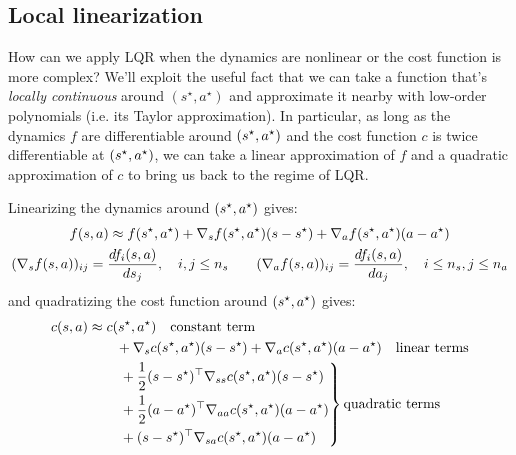 \documentclass[\main/main]{subfiles}
\begin{document}
\subsection{Local linearization}

How can we apply LQR when the dynamics are nonlinear or the cost function is more complex?
We'll exploit the useful fact that we can take a function that's \emph{locally continuous} around $(s^\star, a^\star)$ and approximate it nearby with low-order polynomials (i.e. its Taylor approximation).
In particular, as long as the dynamics $f$ are differentiable around $(s^\star, a^\star)$ and the cost function $c$ is twice differentiable at $(s^\star, a^\star)$, we can take a linear approximation of $f$ and a quadratic approximation of $c$ to bring us back to the regime of LQR.

Linearizing the dynamics around $(s^\star, a^\star)$ gives:
\begin{gather*}
    f(s, a) \approx f(s^\star, a^\star) + \nabla_s f(s^\star, a^\star) (s - s^\star) + \nabla_a f(s^\star, a^\star) (a - a^\star) \\
    (\nabla_s f(s, a))_{ij} = \frac{d f_i(s, a)}{d s_j}, \quad i, j \le n_s \qquad (\nabla_a f(s, a))_{ij} = \frac{d f_i(s, a)}{d a_j}, \quad i \le n_s, j \le n_a
\end{gather*}
and quadratizing the cost function around $(s^\star, a^\star)$ gives:
\begin{align*}
    c(s, a) & \approx c(s^\star, a^\star) \quad \text{constant term}                                                                                      \\
                 & \qquad + \nabla_s c(s^\star, a^\star) (s - s^\star) + \nabla_a c(s^\star, a^\star) (a - a^\star) \quad \text{linear terms} \\
                 & \left. \begin{aligned}
                               & \qquad + \frac{1}{2} (s - s^\star)^\top \nabla_{s s} c(s^\star, a^\star) (s - s^\star)       \\
                               & \qquad + \frac{1}{2} (a - a^\star)^\top \nabla_{a a} c(s^\star, a^\star) (a - a^\star) \\
                               & \qquad + (s - s^\star)^\top \nabla_{s a} c(s^\star, a^\star) (a - a^\star)
                          \end{aligned} \right\} \text{quadratic terms}
\end{align*}
\end{document}
